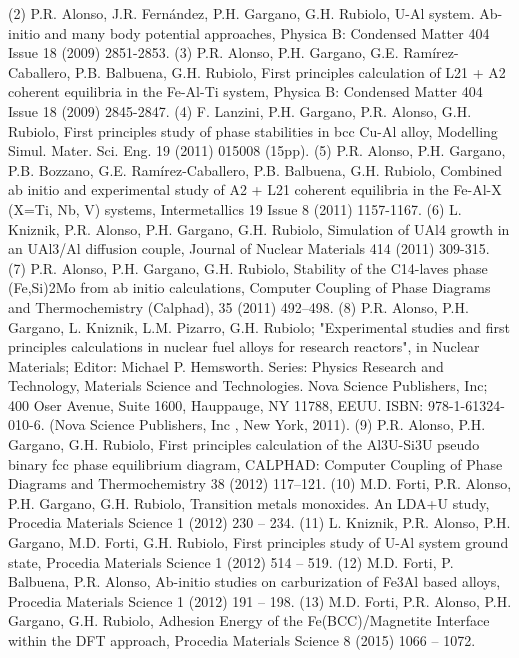     (2)  P.R. Alonso, J.R. Fernández, P.H. Gargano, G.H. Rubiolo, U-Al system. Ab-initio and many body potential approaches, Physica B: Condensed Matter 404 Issue 18 (2009) 2851-2853.
    (3) P.R. Alonso, P.H. Gargano, G.E. Ramírez-Caballero, P.B. Balbuena, G.H. Rubiolo, First principles calculation of L21 + A2 coherent equilibria in the Fe-Al-Ti system, Physica B: Condensed Matter 404 Issue 18 (2009) 2845-2847. 
    (4)  F. Lanzini, P.H. Gargano, P.R. Alonso, G.H. Rubiolo, First principles study of phase stabilities in bcc Cu-Al alloy, Modelling Simul. Mater. Sci. Eng. 19 (2011) 015008 (15pp).
    (5)  P.R. Alonso, P.H. Gargano, P.B. Bozzano, G.E. Ramírez-Caballero, P.B. Balbuena, G.H. Rubiolo, Combined ab initio and experimental study of A2 + L21 coherent equilibria in the Fe-Al-X (X=Ti, Nb, V) systems, Intermetallics 19 Issue 8 (2011) 1157-1167. 
    (6)  L. Kniznik, P.R. Alonso, P.H. Gargano, G.H. Rubiolo, Simulation of UAl4 growth in an UAl3/Al diffusion couple, Journal of Nuclear Materials 414 (2011) 309-315. 
    (7)  P.R. Alonso, P.H. Gargano, G.H. Rubiolo, Stability of the C14-laves phase (Fe,Si)2Mo from ab initio calculations, Computer Coupling of Phase Diagrams and Thermochemistry (Calphad), 35 (2011) 492–498. 
    (8)  P.R. Alonso, P.H. Gargano, L. Kniznik, L.M. Pizarro, G.H. Rubiolo; "Experimental studies and first principles calculations in nuclear fuel alloys for research reactors", in Nuclear Materials; Editor: Michael P. Hemsworth. Series: Physics Research and Technology, Materials Science and Technologies. Nova Science Publishers, Inc; 400 Oser Avenue, Suite 1600, Hauppauge, NY 11788, EEUU. ISBN: 978-1-61324-010-6. (Nova Science Publishers, Inc , New York, 2011).
    (9)  P.R. Alonso, P.H. Gargano, G.H. Rubiolo, First principles calculation of the Al3U-Si3U pseudo binary fcc phase equilibrium diagram, CALPHAD: Computer Coupling of Phase Diagrams and Thermochemistry 38 (2012) 117–121.
    (10)  M.D. Forti, P.R. Alonso, P.H. Gargano, G.H. Rubiolo, Transition metals monoxides. An LDA+U study, Procedia Materials Science 1 (2012) 230 – 234.
    (11) L. Kniznik, P.R. Alonso, P.H. Gargano, M.D. Forti, G.H. Rubiolo, First principles study of U-Al system ground state, Procedia Materials Science 1 (2012) 514 – 519.
    (12)  M.D. Forti, P. Balbuena, P.R. Alonso, Ab-initio studies on carburization of Fe3Al based alloys, Procedia Materials Science 1 (2012) 191 – 198.
    (13)  M.D. Forti, P.R. Alonso, P.H. Gargano, G.H. Rubiolo, Adhesion Energy of the Fe(BCC)/Magnetite Interface within the DFT approach, Procedia Materials Science 8 (2015) 1066 – 1072.
